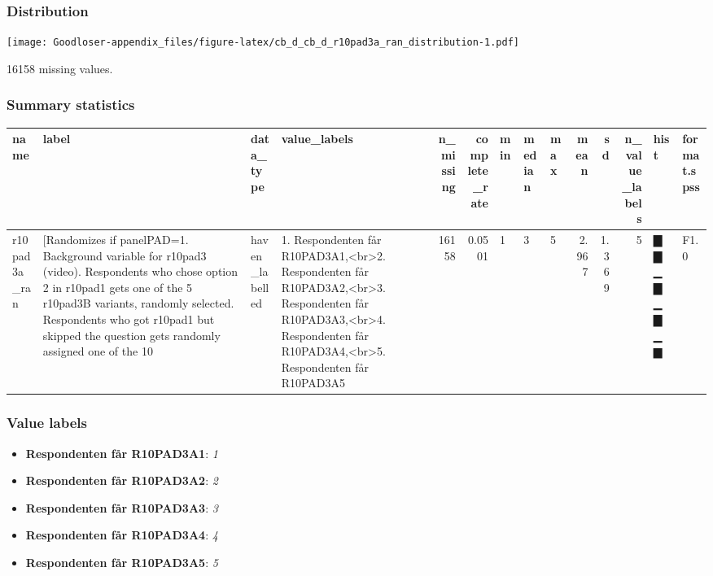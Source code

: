 \documentclass[
]{book}
\providecommand{\tightlist}{%
  \setlength{\itemsep}{0pt}\setlength{\parskip}{0pt}}
\begin{document}
\hypertarget{r10pad3a_ran_distribution}{%
\subsubsection{Distribution}\label{r10pad3a_ran_distribution}}

\texttt{[image: Goodloser-appendix\_files/figure-latex/cb\_d\_cb\_d\_r10pad3a\_ran\_distribution-1.pdf]}

16158 missing values.

\hypertarget{r10pad3a_ran_summary}{%
\subsubsection{Summary statistics}\label{r10pad3a_ran_summary}}

\begin{tabular}{l|l|l|l|r|r|l|l|l|r|r|r|l|l}
\hline
name & label & data_type & value_labels & n_missing & complete_rate & min & median & max & mean & sd & n_value_labels & hist & format.spss\\
\hline
r10pad3a_ran & [Randomizes if panelPAD=1. Background variable for r10pad3 (video). Respondents who chose option 2 in r10pad1 gets one of the 5 r10pad3B variants, randomly selected. Respondents who got r10pad1 but skipped the question gets randomly assigned one of the 10 & haven_labelled & 1. Respondenten får R10PAD3A1,<br>2. Respondenten får R10PAD3A2,<br>3. Respondenten får R10PAD3A3,<br>4. Respondenten får R10PAD3A4,<br>5. Respondenten får R10PAD3A5 & 16158 & 0.0501 & 1 & 3 & 5 & 2.967 & 1.369 & 5 & ▇▇▁▇▁▇▁▆ & F1.0\\
\hline
\end{tabular}

\hypertarget{r10pad3a_ran_labels}{%
\subsubsection{Value labels}\label{r10pad3a_ran_labels}}

\begin{itemize}
\tightlist
\item
  \textbf{Respondenten får R10PAD3A1}: \emph{1}
\item
  \textbf{Respondenten får R10PAD3A2}: \emph{2}
\item
  \textbf{Respondenten får R10PAD3A3}: \emph{3}
\item
  \textbf{Respondenten får R10PAD3A4}: \emph{4}
\item
  \textbf{Respondenten får R10PAD3A5}: \emph{5}
\end{itemize}
\end{document}
